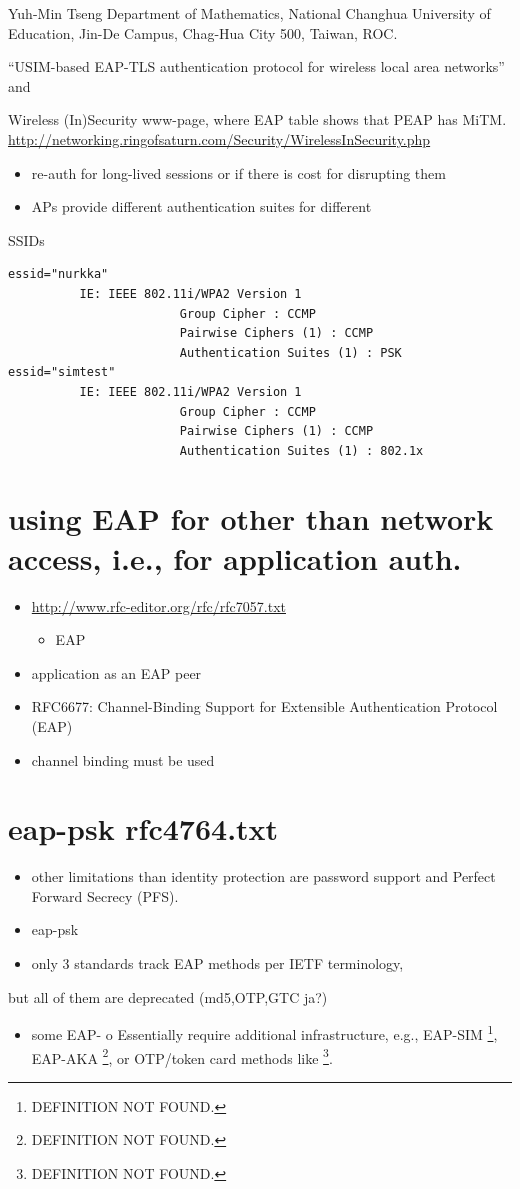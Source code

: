 \documentclass[12pt,a4paper,english]{tutthesis}
\begin{document}
Yuh-Min Tseng Department of Mathematics, National Changhua University of Education,
Jin-De Campus, Chag-Hua City 500, Taiwan, ROC.

``USIM-based EAP-TLS authentication protocol for
wireless local area networks''
and 

Wireless (In)Security www-page, where 
EAP table shows that PEAP has MiTM.
\url{http://networking.ringofsaturn.com/Security/WirelessInSecurity.php}

\begin{itemize}
\item re-auth for long-lived sessions or if there is cost for disrupting them
\item APs provide different authentication suites for different
\end{itemize}
SSIDs 
\begin{verbatim}
essid="nurkka"
          IE: IEEE 802.11i/WPA2 Version 1
                        Group Cipher : CCMP
                        Pairwise Ciphers (1) : CCMP
                        Authentication Suites (1) : PSK
essid="simtest"
          IE: IEEE 802.11i/WPA2 Version 1
                        Group Cipher : CCMP
                        Pairwise Ciphers (1) : CCMP
                        Authentication Suites (1) : 802.1x
\end{verbatim}
\section{using EAP for other than network access, i.e., for application auth.}
\label{sec-8-2}
\begin{itemize}
\item \url{http://www.rfc-editor.org/rfc/rfc7057.txt}
\begin{itemize}
\item EAP
\end{itemize}
\item application as an EAP peer
\item RFC6677: Channel-Binding Support for Extensible Authentication Protocol (EAP)
\item channel binding must be used
\end{itemize}

\section{eap-psk rfc4764.txt}
\label{sec-8-3}
\begin{itemize}
\item other limitations than identity protection are password support and Perfect Forward Secrecy (PFS).
\item eap-psk
\item only 3 standards track EAP methods per IETF terminology,
\end{itemize}
but all of them are deprecated (md5,OTP,GTC ja?)
\begin{itemize}
\item some EAP- o  Essentially require additional infrastructure, e.g., EAP-SIM \footnote{DEFINITION NOT FOUND.},
EAP-AKA \footnote{DEFINITION NOT FOUND.}, or OTP/token card methods like \footnote{DEFINITION NOT FOUND.}.
\end{itemize}
\end{document}
